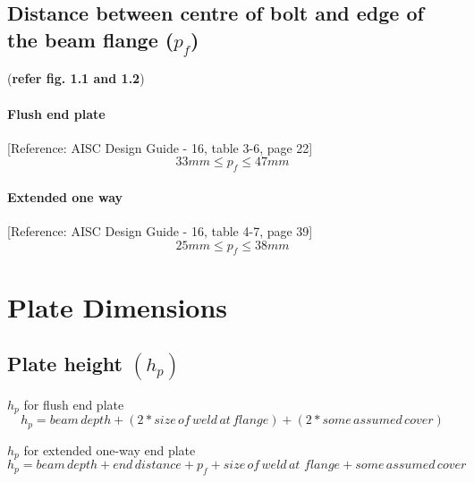 \documentclass[11.5pt,a4paper,oneside]{report}
\begin{document}
\begin{Form}
\section{Distance between centre of bolt and edge of the beam flange ($p_{f}$)}

 (\textbf{refer fig. 1.1 and 1.2})\\
				
					\subsubsection{Flush end plate}
						[Reference: AISC Design Guide - 16, table 3-6, page 22]
						\begin{equation}
							\boxed{ 33 mm \leq p_{f} \leq 47 mm }
						\end{equation}
						
						\subsubsection{Extended one way}
						[Reference: AISC Design Guide - 16, table 4-7, page 39]
						\begin{equation}
							\boxed{ 25 mm \leq p_{f} \leq 38 mm }
						\end{equation}

	    

\chapter{Plate Dimensions} 
\section{Plate height $(h_{p})$}
				
 \large {$h_{p}$ for flush end plate}
					\begin{equation}
					\boxed{h_{p} = beam\, depth + (2 * size\, of\, weld\, at\, flange) + (2 * some\, assumed\, cover)}
					\end{equation}
		
\large {$h_{p}$ for extended one-way end plate}
					\begin{equation}
					\boxed{h_{p} = beam\, depth + end\, distance + p_{f} + size\, of\, weld\, at\, \,flange + some\, assumed\, cover}
					\end{equation}
					

\end{Form}
\end{document}
